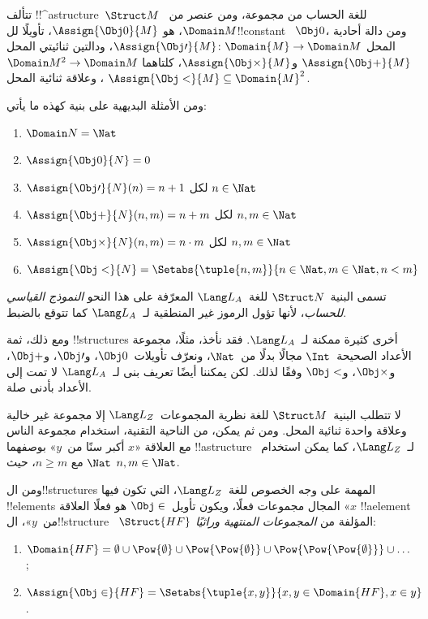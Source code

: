 \documentclass[../../../include/open-logic-section]{subfiles}
\begin{document}
\begin{ex}
تتألف !!^a{structure}~$\Struct M$ للغة الحساب من مجموعة، ومن عنصر
من~$\Domain M$، هو $\Assign{\Obj 0}{M}$، تأويلًا لل!!{constant}
~$\Obj 0$، ومن دالة أحادية المحل
$\Assign{\Obj \prime}{M} \colon \Domain{M} \to \Domain M$،
ودالتين ثنائيتي المحل $\Assign{\Obj +}{M}$ و$\Assign{\Obj
  \times}{M}$، كلتاهما $\Domain M^2 \to \Domain M$، وعلاقة ثنائية
المحل $\Assign{\Obj <}{M} \subseteq \Domain{M}^2$.

ومن الأمثلة البديهية على بنية كهذه ما يأتي:
\begin{enumerate}
\item $\Domain N = \Nat$
\item $\Assign{\Obj 0}{N} = 0$
\item $\Assign{\Obj \prime}{N}(n) = n + 1$ لكل $n \in \Nat$
\item $\Assign{\Obj +}{N}(n, m) = n + m$ لكل $n, m \in \Nat$
\item $\Assign{\Obj \times}{N}(n, m) = n\cdot m$ لكل $n, m \in \Nat$
\item $\Assign{\Obj <}{N} = \Setabs{\tuple{n, m}}{n \in \Nat, m \in
  \Nat, n < m}$
\end{enumerate}
تسمى البنية~$\Struct N$ للغة~$\Lang L_A$ المعرّفة على هذا النحو
\emph{النموذج القياسي للحساب}، لأنها تؤول الرموز غير المنطقية
لـ~$\Lang L_A$ كما تتوقع بالضبط.

ومع ذلك، ثمة !!{structure}s أخرى كثيرة ممكنة لـ~$\Lang L_A$. فقد
نأخذ، مثلًا، مجموعة الأعداد الصحيحة~$\Int$ مجالًا بدلًا من~$\Nat$،
ونعرّف تأويلات~$\Obj 0$، و$\Obj \prime$، و$\Obj +$، و$\Obj
\times$، و$\Obj <$ وفقًا لذلك. لكن يمكننا أيضًا تعريف بنى
لـ~$\Lang L_A$ لا تمت إلى الأعداد بأدنى صلة.
\end{ex}

\begin{ex}
لا تتطلب البنية~$\Struct M$ للغة نظرية المجموعات~$\Lang L_Z$ إلا
مجموعة غير خالية وعلاقة واحدة ثنائية المحل. ومن ثم يمكن، من الناحية
التقنية، استخدام مجموعة الناس مع العلاقة «$x$ أكبر سنًا من~$y$»
بوصفهما !!a{structure} لـ~$\Lang L_Z$، كما يمكن استخدام~$\Nat$ مع
$n \ge m$، حيث $n, m \in \Nat$.

ومن ال!!{structure}s المهمة على وجه الخصوص للغة~$\Lang L_Z$، التي
تكون فيها !!{element}s المجال مجموعات فعلًا، ويكون تأويل~$\Obj \in$
هو فعلًا العلاقة «$x$ !!a{element} من~$y$»، ال!!{structure}
~$\Struct{{HF}}$ المؤلفة من \emph{المجموعات المنتهية وراثيًا}:
\begin{enumerate}
\item $\Domain{{{HF}}} = \emptyset \cup \Pow{\emptyset} \cup
  \Pow{\Pow{\emptyset}} \cup \Pow{\Pow{\Pow{\emptyset}}} \cup \dots$;
\item $\Assign{\Obj \in}{{{HF}}} = \Setabs{\tuple{x, y}}{x, y \in
  \Domain{{{HF}}}, x \in y}$.
\end{enumerate}
\end{ex}
\end{document}
